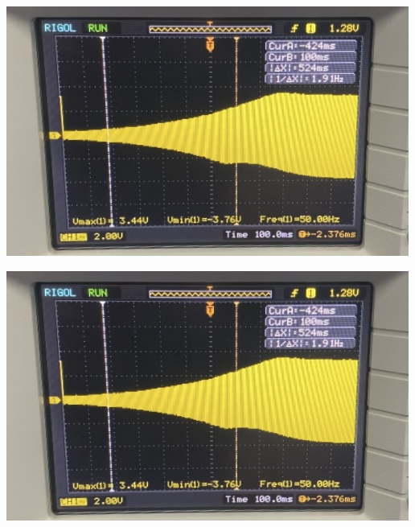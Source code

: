 \documentclass[a4paper,11pt,UTF8]{ctexart}
\begin{document}
\includegraphics[width = \textwidth]{起振.png}

\includegraphics[width = \textwidth]{停摆.png}
\end{document}
